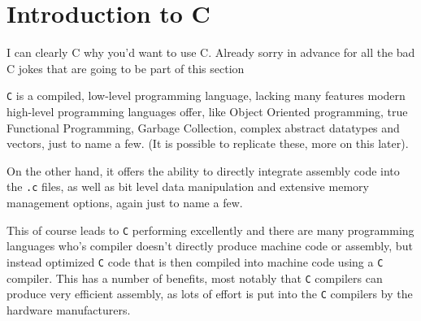 \newsection
\section{Introduction to C}
I can clearly C why you'd want to use C. Already sorry in advance for all the bad C jokes that are going to be part of this section

\texttt{C} is a compiled, low-level programming language, lacking many features modern high-level programming languages offer, like Object Oriented programming, true Functional Programming, Garbage Collection, complex abstract datatypes and vectors, just to name a few. (It is possible to replicate these, more on this later).

On the other hand, it offers the ability to directly integrate assembly code into the \texttt{.c} files, as well as bit level data manipulation and extensive memory management options, again just to name a few.

This of course leads to \texttt{C} performing excellently and there are many programming languages who's compiler doesn't directly produce machine code or assembly, but instead optimized \texttt{C} code that is then compiled into machine code using a \texttt{C} compiler.
This has a number of benefits, most notably that \texttt{C} compilers can produce very efficient assembly, as lots of effort is put into the \texttt{C} compilers by the hardware manufacturers.
